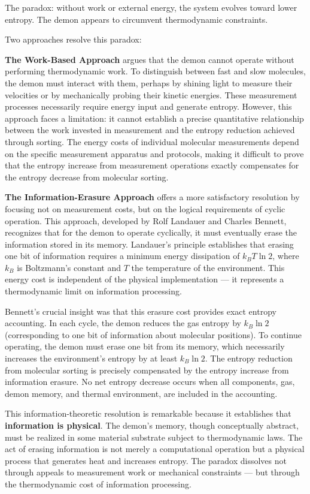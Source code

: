 The paradox: without work or external energy, the system evolves toward lower entropy. The demon appears to circumvent thermodynamic constraints.

Two approaches resolve this paradox:

\textbf{The Work-Based Approach} argues that the demon cannot operate without performing thermodynamic work. To distinguish between fast and slow molecules, the demon must interact with them, perhaps by shining light to measure their velocities or by mechanically probing their kinetic energies. These measurement processes necessarily require energy input and generate entropy. However, this approach faces a limitation: it cannot establish a precise quantitative relationship between the work invested in measurement and the entropy reduction achieved through sorting. The energy costs of individual molecular measurements depend on the specific measurement apparatus and protocols, making it difficult to prove that the entropy increase from measurement operations exactly compensates for the entropy decrease from molecular sorting.

\textbf{The Information-Erasure Approach} offers a more satisfactory resolution by focusing not on measurement costs, but on the logical requirements of cyclic operation. This approach, developed by Rolf Landauer and Charles Bennett, recognizes that for the demon to operate cyclically, it must eventually erase the information stored in its memory. Landauer's principle establishes that erasing one bit of information requires a minimum energy dissipation of $k_B T \ln 2$, where $k_B$ is Boltzmann's constant and $T$ the temperature of the environment. This energy cost is independent of the physical implementation — it represents a thermodynamic limit on information processing.

Bennett's crucial insight was that this erasure cost provides exact entropy accounting. In each cycle, the demon reduces the gas entropy by $k_B \ln 2$ (corresponding to one bit of information about molecular positions). To continue operating, the demon must erase one bit from its memory, which necessarily increases the environment's entropy by at least $k_B \ln 2$. The entropy reduction from molecular sorting is precisely compensated by the entropy increase from information erasure. No net entropy decrease occurs when all components, gas, demon memory, and thermal environment, are included in the accounting.

This information-theoretic resolution is remarkable because it establishes that \textbf{information is physical}. The demon's memory, though conceptually abstract, must be realized in some material substrate subject to thermodynamic laws. The act of erasing information is not merely a computational operation but a physical process that generates heat and increases entropy. The paradox dissolves not through appeals to measurement work or mechanical constraints — but through the thermodynamic cost of information processing.

